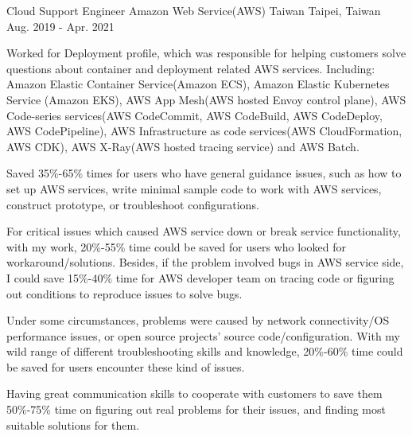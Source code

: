 \begin{cventries}
    \cventry
        {Cloud Support Engineer}
        {Amazon Web Service(AWS) Taiwan}
        {Taipei, Taiwan}
        {Aug. 2019 - Apr. 2021}
        {
            \begin{cvitems}
                \item
                    {
                        Worked for Deployment profile, which was responsible for helping customers solve questions about container and deployment related AWS services. Including: Amazon Elastic Container Service(Amazon ECS), Amazon Elastic Kubernetes Service (Amazon EKS), AWS App Mesh(AWS hosted Envoy control plane), AWS Code-series services(AWS CodeCommit, AWS CodeBuild, AWS CodeDeploy, AWS CodePipeline), AWS Infrastructure as code services(AWS CloudFormation, AWS CDK), AWS X-Ray(AWS hosted tracing service) and AWS Batch.
                    }
                \item
                    {
                        Saved 35\%-65\% times for users who have general guidance issues, such as how to set up AWS services, write minimal sample code to work with AWS services, construct prototype, or troubleshoot configurations. 
                    }
                \item
                    {
                        For critical issues which caused AWS service down or break service functionality, with my work, 20\%-55\% time could be saved for users who looked for workaround/solutions. Besides, if the problem involved bugs in AWS service side, I could save 15\%-40\% time for AWS developer team on tracing code or figuring out conditions to reproduce issues to solve bugs.
                    }
                \item
                    {
                        Under some circumstances, problems were caused by network connectivity/OS performance issues, or open source projects' source code/configuration. With my wild range of different troubleshooting skills and knowledge, 20\%-60\% time could be saved for users encounter these kind of issues.
                    }
                \item
                    {
                        Having great communication skills to cooperate with customers to save them 50\%-75\% time on figuring out real problems for their issues, and finding most suitable solutions for them.
                    }
            \end{cvitems}
        }


\end{cventries}
